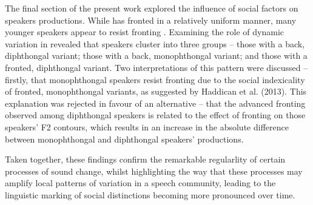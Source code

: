 \documentclass[12pt]{article}
\begin{document}
The final section of the present work explored the influence of social factors on speakers  productions. While  has fronted in a relatively uniform manner, many younger speakers appear to resist fronting . Examining the role of dynamic variation in  revealed that speakers cluster into three groups -- those with a back, diphthongal variant; those with a back, monophthongal variant; and those with a fronted, diphthongal variant. Two interpretations of this pattern were discussed -- firstly, that monophthongal speakers resist fronting due to the social indexicality of fronted, monophthongal variants, as suggested by Haddican et al. (2013). This explanation was rejected in favour of an alternative -- that the advanced fronting observed among diphthongal speakers is related to the effect of fronting on those speakers' F2 contours, which results in an increase in the absolute difference between monophthongal and diphthongal speakers' productions.

Taken together, these findings confirm the remarkable regularlity of certain processes of sound change, whilst highlighting the way that these processes may amplify local patterns of variation in a speech community, leading to the linguistic marking of social distinctions becoming more pronounced over time.


\nocite{*}

\end{document}
